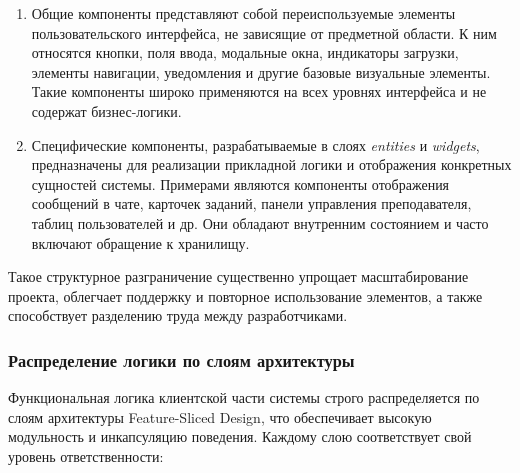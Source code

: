 \begin{enumerate}
  \item Общие компоненты представляют собой переиспользуемые элементы пользовательского интерфейса, не зависящие от предметной области. К ним относятся кнопки, поля ввода, модальные окна, индикаторы загрузки, элементы навигации, уведомления и другие базовые визуальные элементы. Такие компоненты широко применяются на всех уровнях интерфейса и не содержат бизнес-логики.
  \item Специфические компоненты, разрабатываемые в слоях \textit{entities} и \textit{widgets}, предназначены для реализации прикладной логики и отображения конкретных сущностей системы. Примерами являются компоненты отображения сообщений в чате, карточек заданий, панели управления преподавателя, таблиц пользователей и др. Они обладают внутренним состоянием и часто включают обращение к хранилищу.
\end{enumerate}

Такое структурное разграничение существенно упрощает масштабирование проекта, облегчает поддержку и повторное использование элементов, а также способствует разделению труда между разработчиками.

\subsubsection{Распределение логики по слоям архитектуры}

Функциональная логика клиентской части системы строго распределяется по слоям архитектуры Feature-Sliced Design, что обеспечивает высокую модульность и инкапсуляцию поведения. Каждому слою соответствует свой уровень ответственности:

